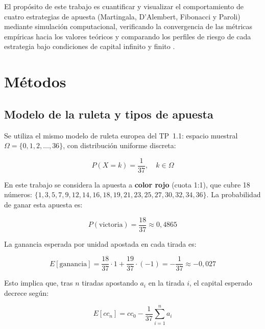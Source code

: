 \documentclass[a4paper, 11pt]{article}
\begin{document}
El propósito de este trabajo es cuantificar y visualizar el comportamiento
de cuatro estrategias de apuesta (Martingala, D'Alembert, Fibonacci y Paroli)
mediante simulación computacional, verificando la convergencia de las
métricas empíricas hacia los valores teóricos y comparando los perfiles de
riesgo de cada estrategia bajo condiciones de capital infinito y finito
\cite{sportium_estrategias}.

\section{Métodos}

\subsection{Modelo de la ruleta y tipos de apuesta}

Se utiliza el mismo modelo de ruleta europea del TP~1.1: espacio muestral
$\Omega = \{0, 1, 2, \ldots, 36\}$, con distribución uniforme discreta:

\begin{equation}
  P(X = k) = \frac{1}{37}, \quad k \in \Omega
  \label{eq:prob_uniforme}
\end{equation}

En este trabajo se considera la apuesta a \textbf{color rojo} (cuota 1:1),
que cubre 18 números: $\{1, 3, 5, 7, 9, 12, 14, 16, 18, 19, 21, 23, 25,
27, 30, 32, 34, 36\}$. La probabilidad de ganar esta apuesta es:

\begin{equation}
  P(\text{victoria}) = \frac{18}{37} \approx 0{,}4865
  \label{eq:prob_color}
\end{equation}

La ganancia esperada por unidad apostada en cada tirada es:

\begin{equation}
  E[\text{ganancia}] = \frac{18}{37} \cdot 1 + \frac{19}{37} \cdot (-1)
    = -\frac{1}{37} \approx -0{,}027
  \label{eq:ganancia_esperada}
\end{equation}

Esto implica que, tras $n$ tiradas apostando $a_i$ en la tirada $i$, el
capital esperado decrece según:

\begin{equation}
  E[cc_n] = cc_0 - \frac{1}{37} \sum_{i=1}^{n} a_i
  \label{eq:capital_esperado}
\end{equation}
\end{document}

